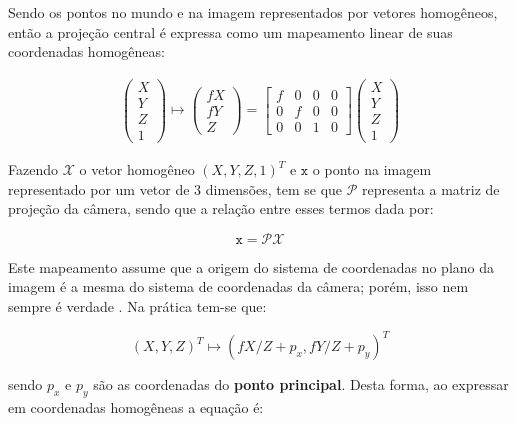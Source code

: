 {Sendo os pontos no mundo e na imagem representados por vetores homogêneos, então
a projeção central é expressa como um mapeamento linear de suas coordenadas
homogêneas:

\begin{align}
\left(\begin{array}{c}
X\\
Y\\
Z\\
1
\end{array}\right) \mapsto
\left(\begin{array}{c}
fX\\
fY\\
Z
\end{array}\right) =
\left[\begin{array}{cccc}
f & 0 & 0 & 0\\
0 & f & 0 & 0\\
0 & 0 & 1 & 0
\end{array}\right]
\left(\begin{array}{c}
X\\
Y\\
Z\\
1
\end{array}\right)
\label{eq:3d_vetHomogeneo1}
\end{align}

Fazendo $\mathcal{X}$ o vetor homogêneo $(X,Y,Z,1)^T$ e $\mathtt{x}$ o ponto na
imagem representado por um vetor de 3 dimensões, tem se que $\bm{\mathcal{P}}$
representa a matriz de projeção da câmera, sendo que a relação entre esses
termos dada por:

\begin{equation}
\mathtt{x} = \bm{\mathcal{P}}\mathcal{X}
\label{eq:3d_Pmatriz}
\end{equation}

Este mapeamento assume que a origem do sistema de coordenadas no plano da imagem
é a mesma do sistema de coordenadas da câmera; porém, isso nem sempre é verdade
\cite{hartley2003multiple}. Na prática tem-se que:

\begin{equation}
(X,Y,Z)^T \mapsto (fX/Z + p_x,fY/Z + p_y)^T
\label{eq:3d_mapForaCentro}
\end{equation}


sendo $p_x$ e $p_y$ são as coordenadas do \textbf{ponto principal}. Desta forma,
ao expressar em coordenadas homogêneas a equação é:

}
